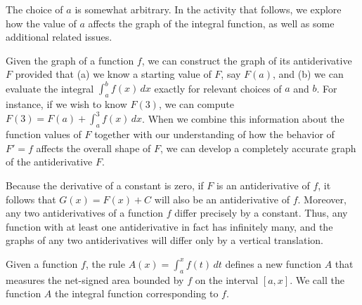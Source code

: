 The choice of $a$ is somewhat arbitrary.  In the activity that follows, we explore how the value of $a$ affects the graph of the integral function, as well as some additional related issues.




\begin{summary}
\item Given the graph of a function $f$, we can construct the graph of its antiderivative $F$ provided that (a) we know a starting value of $F$, say $F(a)$, and (b) we can evaluate the integral $\int_a^b f(x) \, dx$ exactly for relevant choices of $a$ and $b$.  For instance, if we wish to know $F(3)$, we can compute $F(3) = F(a) + \int_a^3 f(x) \, dx$.  When we combine this information about the function values of $F$ together with our understanding of how the behavior of $F' = f$ affects the overall shape of $F$, we can develop a completely accurate graph of the antiderivative $F$.
\item Because the derivative of a constant is zero, if $F$ is an antiderivative of $f$, it follows that $G(x) = F(x) + C$ will also be an antiderivative of $f$.  Moreover, any two antiderivatives of a function $f$ differ precisely by a constant.  Thus, any function with at least one antiderivative in fact has infinitely many, and the graphs of any two antiderivatives will differ only by a vertical translation.
\item Given a function $f$, the rule $A(x) = \int_a^x f(t) \, dt$ defines a new function $A$ that measures the net-signed area bounded by $f$ on the interval $[a,x]$.  We call the function $A$ the integral function corresponding to $f$.
\end{summary}

\nin \hrulefill

 

\clearpage
